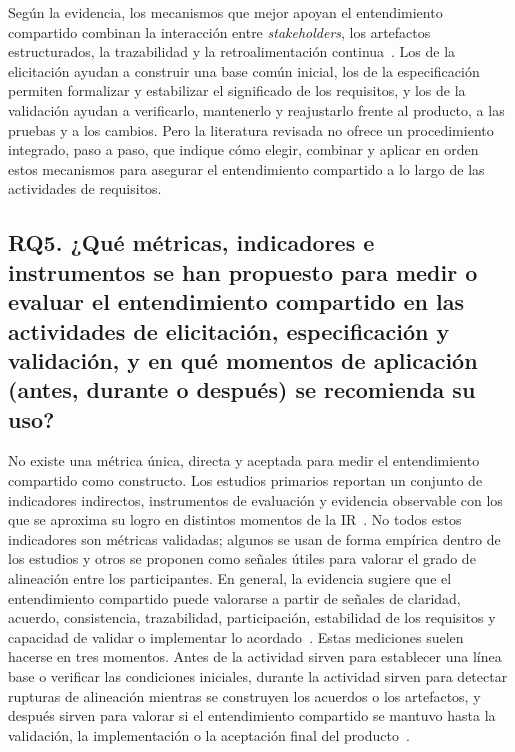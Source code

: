 \documentclass[12pt,letterpaper,oneside]{report}
\begin{document}
Según la evidencia, los mecanismos que mejor apoyan el
entendimiento compartido combinan la interacción entre \textit{stakeholders},
los artefactos estructurados, la trazabilidad y la retroalimentación
continua~\cite{fuller2021blurring}. Los de la elicitación ayudan a construir una
base común inicial, los de la especificación permiten formalizar y estabilizar
el significado de los requisitos, y los de la validación ayudan a verificarlo,
mantenerlo y reajustarlo frente al producto, a las pruebas y a los cambios. Pero
la literatura revisada no ofrece un procedimiento integrado, paso a paso, que
indique cómo elegir, combinar y aplicar en orden estos mecanismos para asegurar
el entendimiento compartido a lo largo de las actividades de requisitos.

\subsection{RQ5. ¿Qué métricas, indicadores e instrumentos se han propuesto para
medir o evaluar el entendimiento compartido en las actividades de elicitación,
especificación y validación, y en qué momentos de aplicación (antes, durante o
después) se recomienda su uso?}
No existe una métrica única, directa y aceptada para medir el entendimiento
compartido como constructo. Los estudios primarios reportan un conjunto de
indicadores indirectos, instrumentos de evaluación y evidencia
observable con los que se aproxima su logro en distintos momentos de la
IR~\cite{balasubramaniam2023}. No todos estos indicadores son métricas
validadas; algunos se usan de forma empírica dentro de los estudios y otros se
proponen como señales útiles para valorar el grado de alineación entre los
participantes. En general, la evidencia sugiere que el entendimiento compartido
puede valorarse a partir de señales de claridad, acuerdo, consistencia,
trazabilidad, participación, estabilidad de los requisitos y capacidad de
validar o implementar lo acordado~\cite{parrales2024}. Estas mediciones suelen
hacerse en tres momentos. Antes de la actividad sirven para establecer una
línea base o verificar las condiciones iniciales, durante la actividad sirven
para detectar rupturas de alineación mientras se construyen los acuerdos o los
artefactos, y después sirven para valorar si el entendimiento compartido se mantuvo hasta
la validación, la implementación o la aceptación final del
producto~\cite{pacheco2022}.
\end{document}
